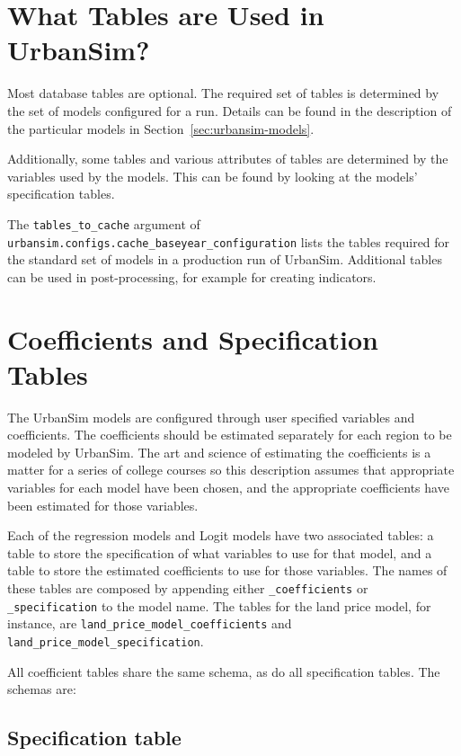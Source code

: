 \section{What Tables are Used in UrbanSim?}
%
Most database tables are optional. The required set of tables is determined by the set of models configured for
a run. Details can be found in the description of the particular models in Section~\ref{sec:urbansim-models}. 

Additionally, some tables and various attributes of tables are determined by 
the variables used by the models.  This can be found by looking at the models'
specification tables.

The \verb|tables_to_cache| argument of
\verb|urbansim.configs.cache_baseyear_configuration| lists the tables required for the standard set of models 
in a production run of UrbanSim. Additional tables can be used in post-processing, for example for creating
indicators.


\section{Coefficients and Specification Tables}

The UrbanSim models are configured through user specified
variables and coefficients. The coefficients should be
estimated separately for each region to be modeled by UrbanSim. The art and
science of estimating the coefficients is a matter for a series of college
courses so this description assumes that appropriate variables for each model
have been chosen, and the appropriate coefficients have been estimated for
those variables.

Each of the regression models and Logit models have two associated
tables: a table to store the specification of what variables to use
for that model, and a table to store the estimated coefficients to
use for those variables.  The names of these tables are composed by
appending either \verb|_coefficients| or \verb|_specification| to
the model name.  The tables for the land price model, for instance,
are \verb|land_price_model_coefficients| and
\verb|land_price_model_specification|.

All coefficient tables share the same schema, as do all
specification tables. The schemas are:


\subsection{Specification table}

